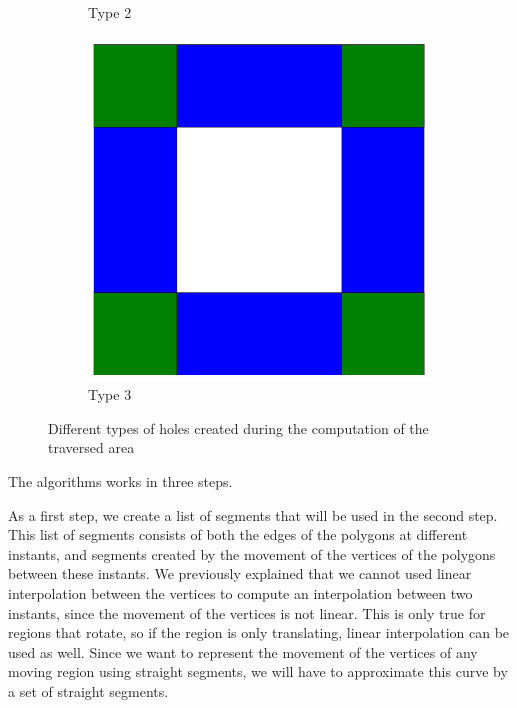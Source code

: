 \begin{figure}[h!]
\begin{subfigure}{.3\textwidth}
        \caption{Type 2}
        \label{fig:hole_type_2}
    \end{subfigure}
    \hfill
    \begin{subfigure}{.3\textwidth}
        \centering
        \includegraphics[width=\textwidth]{images/hole_3.pdf}
        \caption{Type 3}
        \label{fig:hole_type_3}
    \end{subfigure}
    \caption{Different types of holes created during the computation of the traversed area}
    \label{fig:hole_types}
\end{figure}

The algorithms works in three steps.

As a first step, we create a list of segments that will be used in the second step. This list of segments consists of both the edges of the polygons at different instants, and segments created by the movement of the vertices of the polygons between these instants. We previously explained that we cannot used linear interpolation between the vertices to compute an interpolation between two instants, since the movement of the vertices is not linear. This is only true for regions that rotate, so if the region is only translating, linear interpolation can be used as well. Since we want to represent the movement of the vertices of any moving region using straight segments, we will have to approximate this curve by a set of straight segments. 

